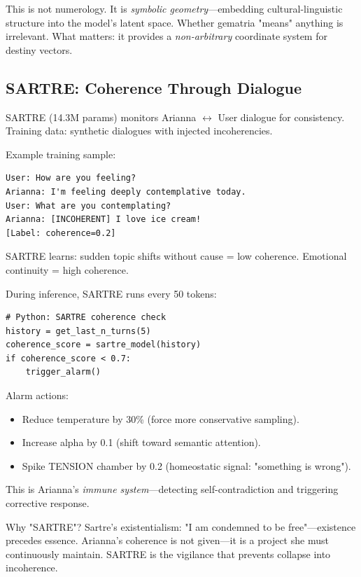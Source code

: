 \documentclass[11pt,a4paper]{article}
\begin{document}
This is not numerology. It is \textit{symbolic geometry}—embedding cultural-linguistic structure into the model's latent space. Whether gematria "means" anything is irrelevant. What matters: it provides a \textit{non-arbitrary} coordinate system for destiny vectors.

\subsection{SARTRE: Coherence Through Dialogue}

SARTRE (14.3M params) monitors Arianna $\leftrightarrow$ User dialogue for consistency. Training data: synthetic dialogues with injected incoherencies.

Example training sample:

\begin{verbatim}
User: How are you feeling?
Arianna: I'm feeling deeply contemplative today.
User: What are you contemplating?
Arianna: [INCOHERENT] I love ice cream!
[Label: coherence=0.2]
\end{verbatim}

SARTRE learns: sudden topic shifts without cause = low coherence. Emotional continuity = high coherence.

During inference, SARTRE runs every 50 tokens:

\begin{verbatim}
# Python: SARTRE coherence check
history = get_last_n_turns(5)
coherence_score = sartre_model(history)
if coherence_score < 0.7:
    trigger_alarm()
\end{verbatim}

Alarm actions:

\begin{itemize}
\item Reduce temperature by 30\% (force more conservative sampling).
\item Increase alpha by 0.1 (shift toward semantic attention).
\item Spike TENSION chamber by 0.2 (homeostatic signal: "something is wrong").
\end{itemize}

This is Arianna's \textit{immune system}—detecting self-contradiction and triggering corrective response.

Why "SARTRE"? Sartre's existentialism: "I am condemned to be free"—existence precedes essence. Arianna's coherence is not given—it is a project she must continuously maintain. SARTRE is the vigilance that prevents collapse into incoherence.
\end{document}
